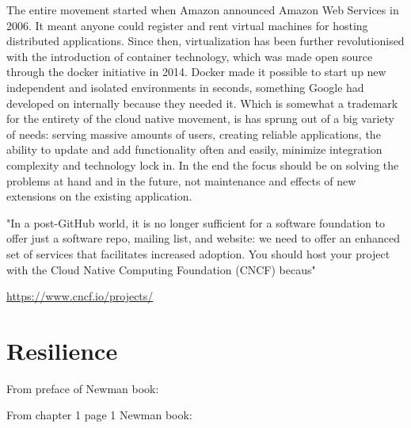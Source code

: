 The entire movement started when Amazon announced Amazon Web Services in 2006. It meant anyone could register and rent virtual machines for hosting distributed applications. Since then, virtualization has been further revolutionised with the introduction of container technology, which was made open source through the docker initiative in 2014. Docker made it possible to start up new independent and isolated environments in seconds, something Google had developed on internally because they needed it\cite{bernstein2014containers}. Which is somewhat a trademark for the entirety of the cloud native movement, is has sprung out of a big variety of needs: serving massive amounts of users, creating reliable applications, the ability to update and add functionality often and easily, minimize integration complexity and technology lock in. In the end the focus should be on solving the problems at hand and in the future, not maintenance and effects of new extensions on the existing application.



"In a post-GitHub world, it is no longer sufficient for a software foundation to offer just a software repo, mailing list, and website: we need to offer an enhanced set of services that facilitates increased adoption. You should host your project with the Cloud Native Computing Foundation (CNCF) becaus"

\url{https://www.cncf.io/projects/}

\section{Resilience}

From preface of Newman book:


From chapter 1 page 1 Newman book: 


